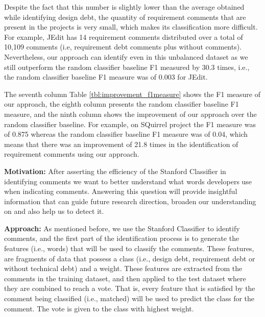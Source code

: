 Despite the fact that this number is slightly lower than the average obtained while identifying design debt, the quantity of requirement \SATD comments that are present in the projects is very small, which makes its classification more difficult. For example, JEdit has 14 requirement \SATD comments distributed over a total of 10,109 comments (i.e, requirement debt comments plus without \SATD comments). Nevertheless, our approach can identify \SATD even in this unbalanced dataset as we still outperform the random classifier baseline F1 measured by 30.3 times, i.e., the random classifier baseline F1 measure was of 0.003 for JEdit. 

The seventh column Table \ref{tbl:improvement_f1measure} shows the F1 measure of our approach, the eighth column presents the random classifier baseline F1 measure, and the ninth column shows the improvement of our approach over the random classifier baseline. For example, on SQuirrel project the F1 measure was of 0.875 whereas the random classifier baseline F1 measure was of 0.04, which means that there was an improvement of 21.8 times in the identification of requirement \SATD comments using our approach. 



\vspace{3mm}
\noindent\rqii
\vspace{3mm}

\noindent \textbf{Motivation:} After asserting the efficiency of the Stanford Classifier in identifying \SATD comments we want to better understand what words developers use when indicating \SATD comments. Answering this question will provide insightful information that can guide future research direction, broaden our understanding on \SATD and also help us to detect it.     

\vspace{1mm}
\noindent \textbf{Approach:} As mentioned before, we use the Stanford Classifier to identify \SATD comments, and the first part of the identification process is to generate the features (i.e., words) that will be used to classify the comments. These features, are fragments of data that possess a class (i.e., design debt, requirement debt or without technical debt) and a weight. These features are extracted from the comments in the training dataset, and then applied to the test dataset where they are combined to reach a vote. That is, every feature that is satisfied by the comment being classified (i.e., matched) will be used to predict the class for the comment. The vote is given to the class with highest weight. 

